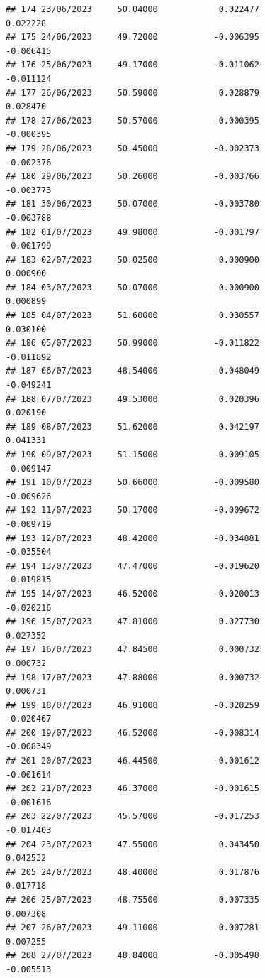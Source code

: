\documentclass[
]{article}
\begin{document}
\begin{verbatim}
## 174 23/06/2023     50.04000            0.022477                0.022228
## 175 24/06/2023     49.72000           -0.006395               -0.006415
## 176 25/06/2023     49.17000           -0.011062               -0.011124
## 177 26/06/2023     50.59000            0.028879                0.028470
## 178 27/06/2023     50.57000           -0.000395               -0.000395
## 179 28/06/2023     50.45000           -0.002373               -0.002376
## 180 29/06/2023     50.26000           -0.003766               -0.003773
## 181 30/06/2023     50.07000           -0.003780               -0.003788
## 182 01/07/2023     49.98000           -0.001797               -0.001799
## 183 02/07/2023     50.02500            0.000900                0.000900
## 184 03/07/2023     50.07000            0.000900                0.000899
## 185 04/07/2023     51.60000            0.030557                0.030100
## 186 05/07/2023     50.99000           -0.011822               -0.011892
## 187 06/07/2023     48.54000           -0.048049               -0.049241
## 188 07/07/2023     49.53000            0.020396                0.020190
## 189 08/07/2023     51.62000            0.042197                0.041331
## 190 09/07/2023     51.15000           -0.009105               -0.009147
## 191 10/07/2023     50.66000           -0.009580               -0.009626
## 192 11/07/2023     50.17000           -0.009672               -0.009719
## 193 12/07/2023     48.42000           -0.034881               -0.035504
## 194 13/07/2023     47.47000           -0.019620               -0.019815
## 195 14/07/2023     46.52000           -0.020013               -0.020216
## 196 15/07/2023     47.81000            0.027730                0.027352
## 197 16/07/2023     47.84500            0.000732                0.000732
## 198 17/07/2023     47.88000            0.000732                0.000731
## 199 18/07/2023     46.91000           -0.020259               -0.020467
## 200 19/07/2023     46.52000           -0.008314               -0.008349
## 201 20/07/2023     46.44500           -0.001612               -0.001614
## 202 21/07/2023     46.37000           -0.001615               -0.001616
## 203 22/07/2023     45.57000           -0.017253               -0.017403
## 204 23/07/2023     47.55000            0.043450                0.042532
## 205 24/07/2023     48.40000            0.017876                0.017718
## 206 25/07/2023     48.75500            0.007335                0.007308
## 207 26/07/2023     49.11000            0.007281                0.007255
## 208 27/07/2023     48.84000           -0.005498               -0.005513

\end{verbatim}
\end{document}
